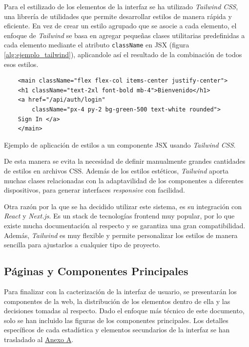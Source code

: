 Para el estilizado de los elementos de la interfaz se ha utilizado \textit{Tailwind CSS}, una librería de utilidades que permite desarrollar estilos de manera rápida y eficiente. En vez de crear un estilo agrupado que se asocie a cada elemento, el enfoque de \textit{Tailwind} se basa en agregar pequeñas clases utilitarias predefinidas a cada elemento mediante el atributo \texttt{className} en JSX (figura \ref{alg:ejemplo_tailwind}), aplicandole así el resultado de la combinación de todos esos estilos.

\setlength{\intextsep}{15pt} %
\setlength{\abovecaptionskip}{0pt} %
\setlength{\belowcaptionskip}{0pt} %

\begin{ifalgorithm}[H]
    \begin{lstlisting}
    <main className="flex flex-col items-center justify-center">
    <h1 className="text-2xl font-bold mb-4">Bienvenido</h1>
    <a href="/api/auth/login"
        className="px-4 py-2 bg-green-500 text-white rounded">
    Sign In </a>
    </main>
    \end{lstlisting}
    \caption{Ejemplo de aplicación de estilos a un componente JSX usando \textit{Tailwind CSS}.}
    \label{alg:ejemplo_tailwind}
\end{ifalgorithm}

De esta manera se evita la necesidad de definir manualmente grandes cantidades de estilos en archivos CSS. Además de los estilos estéticos, \textit{Tailwind} aporta muchas clases relacionadas con la adaptavilidad de los componentes a diferentes dispositivos, para generar interfaces \textit{responsive} con facilidad.

Otra razón por la que se ha decidido utilizar este sistema, es su integración con \textit{React} y \textit{Next.js}. Es un stack de tecnologías frontend muy popular, por lo que existe mucha documentación al respecto y se garantiza una gran compatibilidad. Además, \textit{Tailwind} es muy flexible y permite personalizar los estilos de manera sencilla para ajustarlos a cualquier tipo de proyecto.

\subsection{Páginas y Componentes Principales}

Para finalizar con la cacterización de la interfaz de usuario, se presentarán los componentes de la web, la distribución de los elementos dentro de ella y las decisiones tomadas al respecto. Dado el enfoque más técnico de este documento, solo se han incluido las figuras de los componentes principales. Los detalles específicos de cada estadística y elementos secundarios de la interfaz se han trasladado al \hyperref[ch:anexoA]{Anexo A}.

